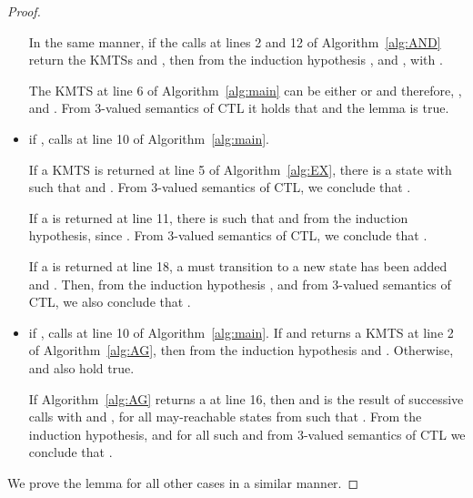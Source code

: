 \begin{proof}
\begin{itemize}
In the same manner, if the calls at lines 2 and 12 of Algorithm~\ref{alg:AND} return the KMTSs  and , then from the induction hypothesis ,  and , 
 with .

The KMTS  at line 6 of Algorithm~\ref{alg:main} can be either  or  and therefore, , 
 and .  From 3-valued semantics of CTL it holds that  and the lemma is true.  

\item if ,  calls 
 at line 10 of 
Algorithm~\ref{alg:main}.    

If a KMTS  is returned at line 5 of Algorithm~\ref{alg:EX}, there is a
state  with  such that 
 and .
From 3-valued semantics of CTL, we conclude that .

If a  is returned at line 11, there is  such that 
and  from the induction hypothesis, since .  From 3-valued semantics of CTL, we conclude that .   

If a  is returned at line 18, a must transition  to a new state has been added and .  Then, from the induction hypothesis ,  and from 3-valued semantics of CTL, we also conclude that . 



























\item if ,  calls 
 at line 10 of 
Algorithm~\ref{alg:main}.  If  and  returns 
a KMTS  at line 2 of Algorithm~\ref{alg:AG}, then from the induction 
hypothesis  and 
.  Otherwise,  and  also hold true.    

If Algorithm~\ref{alg:AG} returns a  at line 16, then  and  is the result of successive  calls with  and , for
all may-reachable states  from  
such that .     
From the induction hypothesis,  and 
 for all such  and from 3-valued semantics of CTL we conclude that .   
  


























\end{itemize}

We prove the lemma for all other cases in a similar manner.  
\end{proof}

